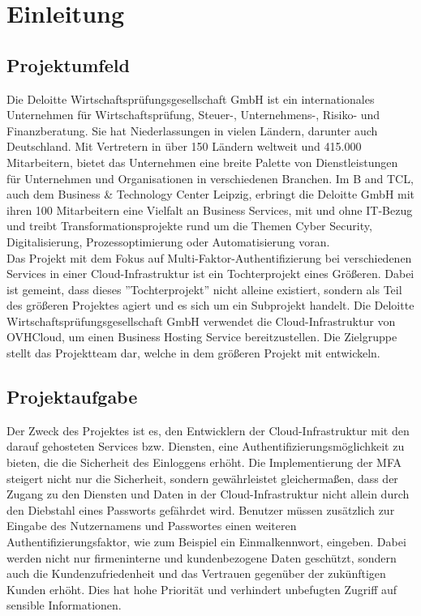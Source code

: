 
\section{Einleitung}
\label{sec:Einleitung}


\subsection{Projektumfeld} 
\label{sec:Projektumfeld}
Die Deloitte Wirtschaftsprüfungsgesellschaft GmbH ist ein internationales 
Unternehmen für Wirtschaftsprüfung, Steuer-, Unternehmens-, Risiko- und Finanzberatung.
Sie hat Niederlassungen in vielen Ländern, darunter auch Deutschland. 
Mit Vertretern in über 150 Ländern weltweit und 415.000 Mitarbeitern, bietet das Unternehmen eine breite Palette 
von Dienstleistungen für Unternehmen und Organisationen in verschiedenen Branchen.
Im \acs{B and TCL}, auch dem Business \& Technology Center Leipzig, erbringt die Deloitte
GmbH mit ihren 100 Mitarbeitern eine Vielfalt an Business Services, mit und ohne IT-Bezug und treibt
Transformationsprojekte rund um die Themen Cyber Security, Digitalisierung,
Prozessoptimierung oder Automatisierung voran. 
\\Das Projekt mit dem Fokus auf Multi-Faktor-Authentifizierung bei verschiedenen Services in einer 
Cloud-Infrastruktur ist ein Tochterprojekt eines Größeren. Dabei ist gemeint, dass dieses 
''Tochterprojekt'' nicht alleine existiert, sondern als Teil des größeren Projektes agiert und es sich 
um ein Subprojekt handelt. Die Deloitte Wirtschaftsprüfungsgesellschaft GmbH verwendet die 
Cloud-Infrastruktur von OVHCloud, um einen Business Hosting Service bereitzustellen.
Die Zielgruppe stellt das Projektteam dar, welche in dem größeren Projekt mit entwickeln.

\subsection{Projektaufgabe}
\label{sec:Projektaufgabe}
Der Zweck des Projektes ist es, den Entwicklern der Cloud-Infrastruktur mit den darauf gehosteten Services bzw. 
Diensten, eine Authentifizierungsmöglichkeit zu bieten, die die Sicherheit des Einloggens erhöht.
Die Implementierung der \acs{MFA} steigert nicht nur die Sicherheit, sondern gewährleistet gleichermaßen, 
dass der Zugang zu den Diensten und Daten in der Cloud-Infrastruktur nicht allein durch den Diebstahl eines 
Passworts gefährdet wird. Benutzer müssen zusätzlich zur Eingabe des Nutzernamens und Passwortes einen weiteren 
Authentifizierungsfaktor, wie zum Beispiel ein Einmalkennwort, eingeben. Dabei werden nicht nur firmeninterne und 
kundenbezogene Daten geschützt, sondern auch die Kundenzufriedenheit und das Vertrauen gegenüber der zukünftigen 
Kunden erhöht. Dies hat hohe Priorität und verhindert unbefugten Zugriff auf sensible Informationen.

